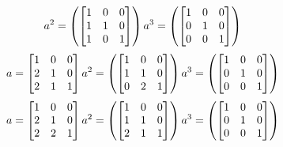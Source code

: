 \begin{mdframed}[style=darkAnswer,frametitle={Joe Starr}]
\begin{itemize}
{$$a^{ 2 }=\left( \begin{bmatrix}1&0&0\\1&1&0\\1&0&1\end{bmatrix} \right)
a^{ 3 }=\left( \begin{bmatrix}1&0&0\\0&1&0\\0&0&1\end{bmatrix} \right)
$$ $$
a= \begin{bmatrix}1&0&0\\2&1&0\\2&1&1\end{bmatrix} \\
a^{ 2 }=\left( \begin{bmatrix}1&0&0\\1&1&0\\0&2&1\end{bmatrix} \right)
a^{ 3 }=\left( \begin{bmatrix}1&0&0\\0&1&0\\0&0&1\end{bmatrix} \right)
$$ $$
a= \begin{bmatrix}1&0&0\\2&1&0\\2&2&1\end{bmatrix} \\
a^{ 2 }=\left( \begin{bmatrix}1&0&0\\1&1&0\\2&1&1\end{bmatrix} \right)
a^{ 3 }=\left( \begin{bmatrix}1&0&0\\0&1&0\\0&0&1\end{bmatrix} \right)
$$

}
\end{itemize}
\end{mdframed}
